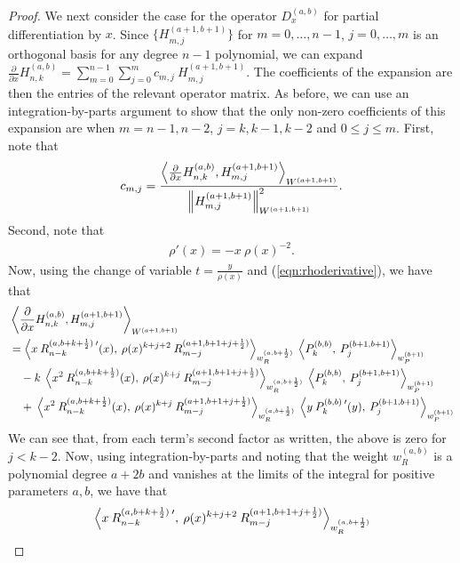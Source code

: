 \documentclass[11pt, oneside]{article}   	%
\newcommand{\half}{\frac{1}{2}}
\newcommand{\pddx}{\frac{\partial}{\partial x}}
\newcommand{\hdop}{H}
\newcommand{\hdopnkab}{\hdop_{n,k}^{(a,b)}}
\newcommand{\genjac}{R}
\newcommand{\genjacnmk}{\genjac_{n-k}}
\newcommand{\genjacmmj}{\genjac_{m-j}}
\newcommand{\genjacw}{w_\genjac}
\begin{document}
\begin{proof}
We next consider the case for the operator $D_x^{(a,b)}$ for partial differentiation by $x$. Since $\{\hdop^{(a+1, b+1)}_{m,j}\}$ for $m = 0,\dots,n-1$, $j = 0,\dots,m$ is an orthogonal basis for any degree $n-1$ polynomial, we can expand $\pddx \hdopnkab = \sum_{m=0}^{n-1} \sum_{j=0}^m c_{m,j} \: \hdop^{(a+1, b+1)}_{m,j}$. The coefficients of the expansion are then the entries of the relevant operator matrix. As before, we can use an integration-by-parts argument to show that the only non-zero coefficients of this expansion are when $m = n-1, n-2$, $j = k, k-1, k-2$ and $0 \le j \le m$. First, note that
\begin{align*}
c_{m,j} = \frac{\ip<\pddx \hdopnkab, \hdop^{(a+1, b+1)}_{m,j} >_{W^{(a+1, b+1)}}}{\norm{\hdop^{(a+1, b+1)}_{m,j}}^2_{W^{(a+1, b+1)}}}.
\end{align*}
Second, note that
\begin{align}
	\rho'(x) = -x \: \rho(x)^{-2}. \label{eqn:rhoderivative}
\end{align}
Now, using the change of variable $t= \frac{y}{\rho(x)}$ and (\ref{eqn:rhoderivative}), we have that
\begin{align*}
	&\ip<\pddx \hdopnkab, \hdop^{(a+1, b+1)}_{m,j} >_{W^{(a+1, b+1)}} \nonumber \\ 
	&= \ip< x \: \genjacnmk^{(a, b+k+\half) \: \prime} (x), \: \rho(x)^{k+j+2} \: \genjacmmj^{(a+1, b+1+j+\half)} >_{\genjacw^{(a, b+\half)}} 
		\: \ip< P_k^{(b,b)}, \: P_j^{(b+1,b+1)} >_{w_P^{(b+1)}}  \nonumber \\ 
	& \quad - k \: \ip< x^2 \: \genjacnmk^{(a, b+k+\half)}(x), \: \rho(x)^{k+j} \: \genjacmmj^{(a+1, b+1+j+\half)} >_{\genjacw^{(a, b+\half)}} 
		\: \ip< P_k^{(b,b)}, \: P_j^{(b+1,b+1)} >_{w_P^{(b+1)}}  \nonumber \\ 
	& \quad + \: \ip< x^2 \: \genjacnmk^{(a, b+k+\half)}(x), \: \rho(x)^{k+j} \: \genjacmmj^{(a+1, b+1+j+\half)} >_{\genjacw^{(a, b+\half)}} 
		\: \ip< y \: P_k^{(b,b) \: \prime} (y), \: P_j^{(b+1,b+1)} >_{w_P^{(b+1)}}  
\end{align*}
We can see that, from each term's second factor as written, the above is zero for $j < k-2$. Now, using integration-by-parts and noting that the weight $\genjacw^{(a,b)}$ is a polynomial degree $a+2b$ and vanishes at the limits of the integral for positive parameters $a,b$, we have that
\begin{align*}
	&\ip< x \: \genjacnmk^{(a, b+k+\half) \: \prime}, \: \rho(x)^{k+j+2} \: \genjacmmj^{(a+1, b+1+j+\half)} >_{\genjacw^{(a, b+\half)}}  \\

\end{align*}
\end{proof}
\end{document}
